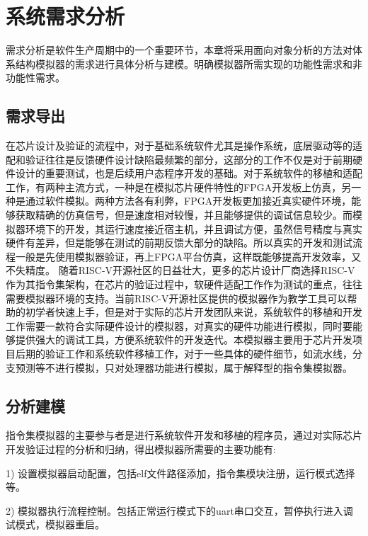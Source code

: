 
\chapter{系统需求分析}

需求分析是软件生产周期中的一个重要环节，本章将采用面向对象分析的方法对体系结构模拟器的需求进行具体分析与建模。明确模拟器所需实现的功能性需求和非功能性需求。

\section{需求导出}

在芯片设计及验证的流程中，对于基础系统软件尤其是操作系统，底层驱动等的适配和验证往往是反馈硬件设计缺陷最频繁的部分，这部分的工作不仅是对于前期硬件设计的重要测试，也是后续用户态程序开发的基础。对于系统软件的移植和适配工作，有两种主流方式，一种是在模拟芯片硬件特性的FPGA开发板上仿真，另一种是通过软件模拟。两种方法各有利弊，FPGA开发板更加接近真实硬件环境，能够获取精确的仿真信号，但是速度相对较慢，并且能够提供的调试信息较少。而模拟器环境下的开发，其运行速度接近宿主机，并且调试方便，虽然信号精度与真实硬件有差异，但是能够在测试的前期反馈大部分的缺陷。所以真实的开发和测试流程一般是先使用模拟器验证，再上FPGA平台仿真，这样既能够提高开发效率，又不失精度。
随着RISC-V开源社区的日益壮大，更多的芯片设计厂商选择RISC-V作为其指令集架构，在芯片的验证过程中，软硬件适配工作作为测试的重点，往往需要模拟器环境的支持。当前RISC-V开源社区提供的模拟器作为教学工具可以帮助的初学者快速上手，但是对于实际的芯片开发团队来说，系统软件的移植和开发工作需要一款符合实际硬件设计的模拟器，对真实的硬件功能进行模拟，同时要能够提供强大的调试工具，方便系统软件的开发迭代。本模拟器主要用于芯片开发项目后期的验证工作和系统软件移植工作，对于一些具体的硬件细节，如流水线，分支预测等不进行模拟，只对处理器功能进行模拟，属于解释型的指令集模拟器。


\section{分析建模}

指令集模拟器的主要参与者是进行系统软件开发和移植的程序员，通过对实际芯片开发验证过程的分析和归纳，得出模拟器所需要的主要功能有:


1) 设置模拟器启动配置，包括elf文件路径添加，指令集模块注册，运行模式选择等。


2) 模拟器执行流程控制。包括正常运行模式下的uart串口交互，暂停执行进入调试模式，模拟器重启。


